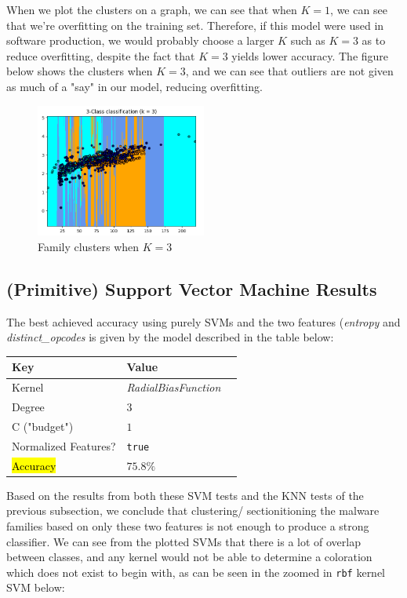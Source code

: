 \documentclass[12pt]{article}
\begin{document}
          When we plot the clusters on a graph, we can see that when $K = 1$, we can see that we're overfitting on the training set. Therefore, if this model were used in software production, we would probably choose a larger $K$ such as $K=3$ as to reduce overfitting, despite the fact that $K=3$ yields lower accuracy. The figure below shows the clusters when $K=3$, and we can see that outliers are not given as much of a "say" in our model, reducing overfitting.
          \begin{figure}[H]
          \centering
          \includegraphics[width=0.5\textwidth]{k3.png}
          \caption{Family clusters when $K=3$}
          \end{figure}
  
\subsection{(Primitive) Support Vector Machine Results}
  The best achieved accuracy using purely SVMs and the two features (\textit{entropy} and \textit{distinct\_opcodes} is given by the model described in the table below:
  \begin{table}[H]
    \centering
  \begin{tabular}{|l|l|l|}
    \hline \textbf{Key} & \textbf{Value} \\\hline \hline
    Kernel                   &        \textit{RadialBiasFunction}\\\hline
  Degree            &        $ 3                   $\\\hline       
  C ("budget")      &        $ 1                  $\\\hline 
  Normalized Features?  &   \texttt{true}  \\\hline 
  \hl{Accuracy} &   $ 75.8\%$\\\hline 
  \end{tabular}
  \end{table}  
 
  Based on the results from both these SVM tests and the KNN tests of the previous subsection, we conclude that clustering/ sectionitioning the malware families based on only these two features is not enough to produce a strong classifier. We can see from the plotted SVMs that there is a lot of overlap between classes, and any kernel would not be able to determine a coloration which does not exist to begin with, as can be seen in the zoomed in \texttt{rbf} kernel SVM below:
\end{document}
